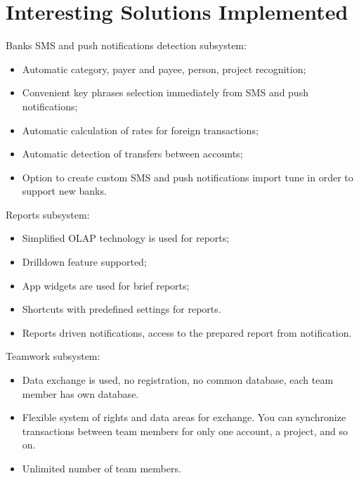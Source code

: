 \documentclass[a4paper,10pt,english]{sphinxmanual}
\begin{document}
\section{Interesting Solutions Implemented}
\label{\detokenize{about:interesting-solutions-implemented}}
\sphinxAtStartPar
Banks SMS and push notifications detection subsystem:
\begin{itemize}
\item {} 
\sphinxAtStartPar
Automatic category, payer and payee, person, project recognition;

\item {} 
\sphinxAtStartPar
Convenient key phrases selection immediately from SMS and push notifications;

\item {} 
\sphinxAtStartPar
Automatic calculation of rates for foreign transactions;

\item {} 
\sphinxAtStartPar
Automatic detection of transfers between accounts;

\item {} 
\sphinxAtStartPar
Option to create custom SMS and push notifications import tune in order to support new banks.

\end{itemize}

\sphinxAtStartPar
Reports subsystem:
\begin{itemize}
\item {} 
\sphinxAtStartPar
Simplified OLAP technology is used for reports;

\item {} 
\sphinxAtStartPar
Drilldown feature supported;

\item {} 
\sphinxAtStartPar
App widgets are used for brief reports;

\item {} 
\sphinxAtStartPar
Shortcuts with predefined settings for reports.

\item {} 
\sphinxAtStartPar
Reports driven notifications, access to the prepared report from notification.

\end{itemize}

\sphinxAtStartPar
Teamwork subsystem:
\begin{itemize}
\item {} 
\sphinxAtStartPar
Data exchange is used, no registration, no common database, each team member has own database.

\item {} 
\sphinxAtStartPar
Flexible system of rights and data areas for exchange. You can synchronize transactions between team members for only one account, a project, and so on.

\item {} 
\sphinxAtStartPar
Unlimited number of team members.

\end{itemize}
\end{document}
